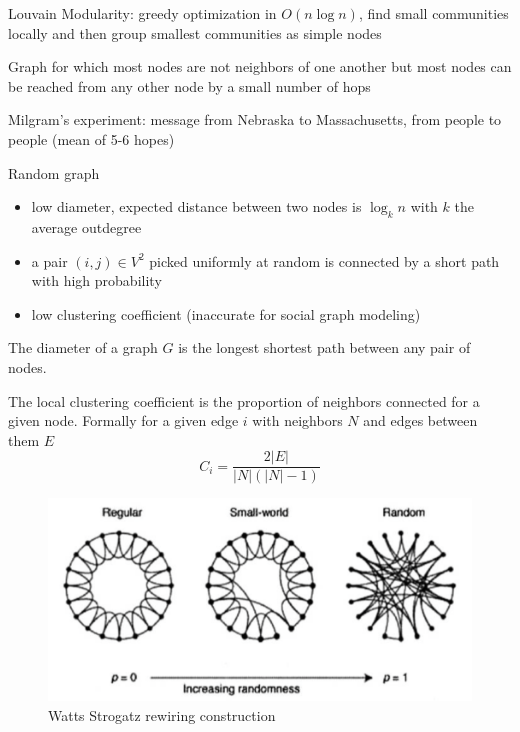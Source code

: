 Louvain Modularity: greedy optimization in $O(n\log n)$, find small communities locally and then group smallest communities as simple nodes

\begin{definition}
  Graph for which most nodes are not neighbors of one another but most nodes can be reached from any other node by a small number of hops
\end{definition}

Milgram's experiment: message from Nebraska to Massachusetts, from people to people (mean of 5-6 hopes)

Random graph
\begin{itemize}
  \item low diameter, expected distance between two nodes is $\log_k n$ with $k$ the average outdegree
  \item a pair $(i,j) \in V^2$ picked uniformly at random is connected by a short path with high probability
  \item low clustering coefficient (inaccurate for social graph modeling)
\end{itemize}

\begin{definition}[diameter]
  The diameter of a graph $G$ is the longest shortest path between any pair of nodes.
\end{definition}

\begin{definition}
  The local clustering coefficient is the proportion of neighbors connected for a given node. Formally for a given edge $i$ with neighbors $N$ and edges between them $E$
  \[
    C_i = \frac { 2|E|}{|N|(|N|-1)}
  \]
\end{definition}



\begin{figure}
  \centering
  \includegraphics[width=1\linewidth]{figures/watts_strogatz_graph.png}
  \caption{Watts Strogatz rewiring construction}
  \label{fig:watts_strogatz}
\end{figure}

